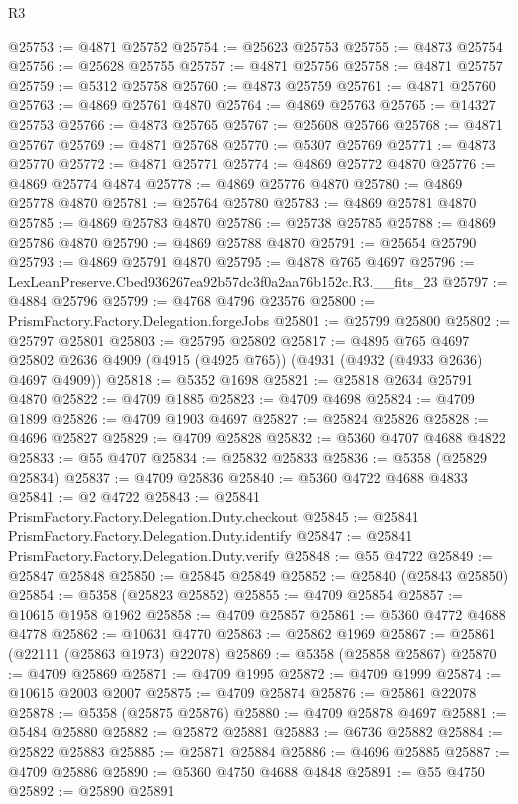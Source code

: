 \begin{lexlean}{R3}
\begin{coremodule}
@25753 := @4871 @25752
@25754 := @25623 @25753
@25755 := @4873 @25754
@25756 := @25628 @25755
@25757 := @4871 @25756
@25758 := @4871 @25757
@25759 := @5312 @25758
@25760 := @4873 @25759
@25761 := @4871 @25760
@25763 := @4869 @25761 @4870
@25764 := @4869 @25763
@25765 := @14327 @25753
@25766 := @4873 @25765
@25767 := @25608 @25766
@25768 := @4871 @25767
@25769 := @4871 @25768
@25770 := @5307 @25769
@25771 := @4873 @25770
@25772 := @4871 @25771
@25774 := @4869 @25772 @4870
@25776 := @4869 @25774 @4874
@25778 := @4869 @25776 @4870
@25780 := @4869 @25778 @4870
@25781 := @25764 @25780
@25783 := @4869 @25781 @4870
@25785 := @4869 @25783 @4870
@25786 := @25738 @25785
@25788 := @4869 @25786 @4870
@25790 := @4869 @25788 @4870
@25791 := @25654 @25790
@25793 := @4869 @25791 @4870
@25795 := @4878 @765 @4697
@25796 := LexLeanPreserve.Cbed936267ea92b57dc3f0a2aa76b152c.R3.__fits_23
@25797 := @4884 @25796
@25799 := @4768 @4796 @23576
@25800 := PrismFactory.Factory.Delegation.forgeJobs
@25801 := @25799 @25800
@25802 := @25797 @25801
@25803 := @25795 @25802
@25817 := @4895
    @765
    @4697
    @25802
    @2636
    @4909
    (@4915 (@4925 @765))
    (@4931 (@4932 (@4933 @2636) @4697 @4909))
@25818 := @5352 @1698
@25821 := @25818 @2634 @25791 @4870
@25822 := @4709 @1885
@25823 := @4709 @4698
@25824 := @4709 @1899
@25826 := @4709 @1903 @4697
@25827 := @25824 @25826
@25828 := @4696 @25827
@25829 := @4709 @25828
@25832 := @5360 @4707 @4688 @4822
@25833 := @55 @4707
@25834 := @25832 @25833
@25836 := @5358 (@25829 @25834)
@25837 := @4709 @25836
@25840 := @5360 @4722 @4688 @4833
@25841 := @2 @4722
@25843 := @25841 PrismFactory.Factory.Delegation.Duty.checkout
@25845 := @25841 PrismFactory.Factory.Delegation.Duty.identify
@25847 := @25841 PrismFactory.Factory.Delegation.Duty.verify
@25848 := @55 @4722
@25849 := @25847 @25848
@25850 := @25845 @25849
@25852 := @25840 (@25843 @25850)
@25854 := @5358 (@25823 @25852)
@25855 := @4709 @25854
@25857 := @10615 @1958 @1962
@25858 := @4709 @25857
@25861 := @5360 @4772 @4688 @4778
@25862 := @10631 @4770
@25863 := @25862 @1969
@25867 := @25861 (@22111 (@25863 @1973) @22078)
@25869 := @5358 (@25858 @25867)
@25870 := @4709 @25869
@25871 := @4709 @1995
@25872 := @4709 @1999
@25874 := @10615 @2003 @2007
@25875 := @4709 @25874
@25876 := @25861 @22078
@25878 := @5358 (@25875 @25876)
@25880 := @4709 @25878 @4697
@25881 := @5484 @25880
@25882 := @25872 @25881
@25883 := @6736 @25882
@25884 := @25822 @25883
@25885 := @25871 @25884
@25886 := @4696 @25885
@25887 := @4709 @25886
@25890 := @5360 @4750 @4688 @4848
@25891 := @55 @4750
@25892 := @25890 @25891

\end{coremodule}
\end{lexlean}
